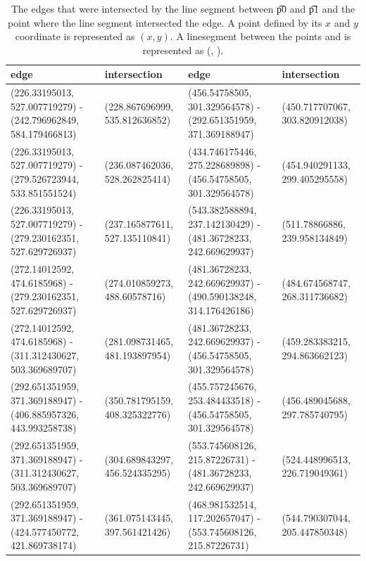 \begin{table}
	\centering
	\footnotesize{
		\begin{tabular}{ll|ll}
		edge & intersection & edge & intersection\\
		\hline
		(\num{226.33195013}, \num{527.007719279}) - (\num{242.796962849}, \num{584.179466813})	&	(\num{228.867696999}, \num{535.812636852})	&	 (\num{456.54758505}, \num{301.329564578}) - (\num{292.651351959}, \num{371.369188947})	&	(\num{450.717707067}, \num{303.820912038})	\\
		(\num{226.33195013}, \num{527.007719279}) - (\num{279.526723944}, \num{533.851551524})	&	(\num{236.087462036}, \num{528.262825414})	&	 (\num{434.746175446}, \num{275.228689898}) - (\num{456.54758505}, \num{301.329564578})	&	(\num{454.940291133}, \num{299.405295558})	\\ 
		(\num{226.33195013}, \num{527.007719279}) - (\num{279.230162351}, \num{527.629726937})	&	(\num{237.165877611}, \num{527.135110841})	&	 (\num{543.382588894}, \num{237.142130429}) - (\num{481.36728233}, \num{242.669629937})	&	(\num{511.78866886}, \num{239.958134849})	\\ 
		(\num{272.14012592}, \num{474.6185968}) - (\num{279.230162351}, \num{527.629726937})	&	(\num{274.010859273}, \num{488.60578716})	&	 (\num{481.36728233}, \num{242.669629937}) - (\num{490.590138248}, \num{314.176426186})	&	(\num{484.674568747}, \num{268.311736682})	\\ 
		(\num{272.14012592}, \num{474.6185968}) - (\num{311.312430627}, \num{503.369689707})	&	(\num{281.098731465}, \num{481.193897954})	&	 (\num{481.36728233}, \num{242.669629937}) - (\num{456.54758505}, \num{301.329564578})	&	(\num{459.283383215}, \num{294.863662123})	\\ 
		(\num{292.651351959}, \num{371.369188947}) - (\num{406.885957326}, \num{443.993258738})	&	(\num{350.781795159}, \num{408.325322776})	&	 (\num{455.757245676}, \num{253.484433518}) - (\num{456.54758505}, \num{301.329564578})	&	(\num{456.489045688}, \num{297.785740795})	\\ 
		(\num{292.651351959}, \num{371.369188947}) - (\num{311.312430627}, \num{503.369689707})	&	(\num{304.689843297}, \num{456.524335295})	&	 (\num{553.745608126}, \num{215.87226731}) - (\num{481.36728233}, \num{242.669629937})	&	(\num{524.448996513}, \num{226.719049361})	\\ 
		(\num{292.651351959}, \num{371.369188947}) - (\num{424.577450772}, \num{421.869738174})	&	(\num{361.075143445}, \num{397.561421426})	&	 (\num{468.981532514}, \num{117.202657047}) - (\num{553.745608126}, \num{215.87226731})	&	(\num{544.790307044}, \num{205.447850348})	\\	 	
		\end{tabular}
	}
	\caption{The edges that were intersected by the line segment between \t{p0} and \t{p1} and the point where the line segment intersected the edge. A point  defined by its $x$ and $y$ coordinate is represented as $(x, y)$. A linesegment between the points  and  is represented as (, ).}
	\label{tab:c:intersectedEdges}
\end{table}

~\\



